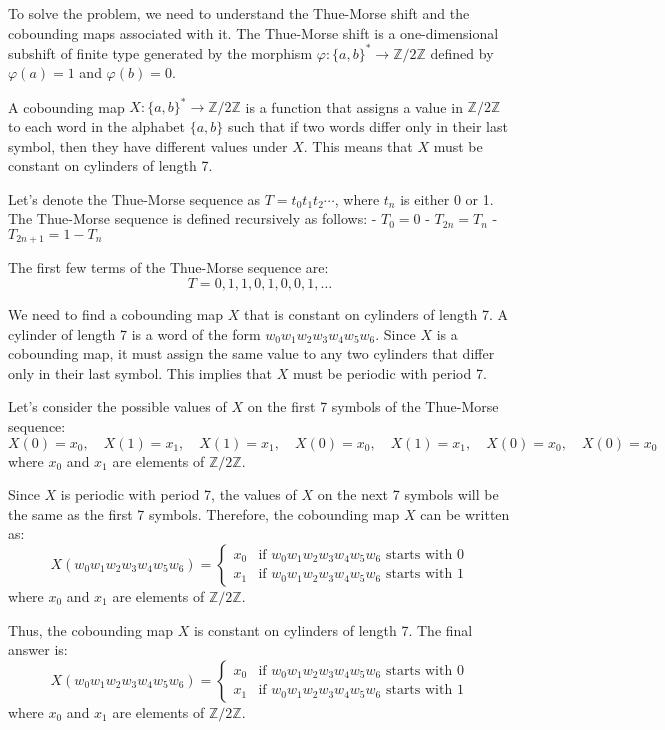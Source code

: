 To solve the problem, we need to understand the Thue-Morse shift and the cobounding maps associated with it. The Thue-Morse shift is a one-dimensional subshift of finite type generated by the morphism \(\varphi: \{a, b\}^* \to \mathbb{Z}/2\mathbb{Z}\) defined by \(\varphi(a) = 1\) and \(\varphi(b) = 0\).

A cobounding map \(X: \{a, b\}^* \to \mathbb{Z}/2\mathbb{Z}\) is a function that assigns a value in \(\mathbb{Z}/2\mathbb{Z}\) to each word in the alphabet \(\{a, b\}\) such that if two words differ only in their last symbol, then they have different values under \(X\). This means that \(X\) must be constant on cylinders of length 7.

Let's denote the Thue-Morse sequence as \(T = t_0 t_1 t_2 \cdots\), where \(t_n\) is either 0 or 1. The Thue-Morse sequence is defined recursively as follows:
- \(T_0 = 0\)
- \(T_{2n} = T_n\)
- \(T_{2n+1} = 1 - T_n\)

The first few terms of the Thue-Morse sequence are:
\[ T = 0, 1, 1, 0, 1, 0, 0, 1, \ldots \]

We need to find a cobounding map \(X\) that is constant on cylinders of length 7. A cylinder of length 7 is a word of the form \(w_0 w_1 w_2 w_3 w_4 w_5 w_6\). Since \(X\) is a cobounding map, it must assign the same value to any two cylinders that differ only in their last symbol. This implies that \(X\) must be periodic with period 7.

Let's consider the possible values of \(X\) on the first 7 symbols of the Thue-Morse sequence:
\[ X(0) = x_0, \quad X(1) = x_1, \quad X(1) = x_1, \quad X(0) = x_0, \quad X(1) = x_1, \quad X(0) = x_0, \quad X(0) = x_0 \]
where \(x_0\) and \(x_1\) are elements of \(\mathbb{Z}/2\mathbb{Z}\).

Since \(X\) is periodic with period 7, the values of \(X\) on the next 7 symbols will be the same as the first 7 symbols. Therefore, the cobounding map \(X\) can be written as:
\[ X(w_0 w_1 w_2 w_3 w_4 w_5 w_6) = 
\begin{cases} 
x_0 & \text{if } w_0 w_1 w_2 w_3 w_4 w_5 w_6 \text{ starts with } 0 \\
x_1 & \text{if } w_0 w_1 w_2 w_3 w_4 w_5 w_6 \text{ starts with } 1 
\end{cases}
\]
where \(x_0\) and \(x_1\) are elements of \(\mathbb{Z}/2\mathbb{Z}\).

Thus, the cobounding map \(X\) is constant on cylinders of length 7. The final answer is:
\[
\boxed{X(w_0 w_1 w_2 w_3 w_4 w_5 w_6) = 
\begin{cases} 
x_0 & \text{if } w_0 w_1 w_2 w_3 w_4 w_5 w_6 \text{ starts with } 0 \\
x_1 & \text{if } w_0 w_1 w_2 w_3 w_4 w_5 w_6 \text{ starts with } 1 
\end{cases}}
\]
where \(x_0\) and \(x_1\) are elements of \(\mathbb{Z}/2\mathbb{Z}\).